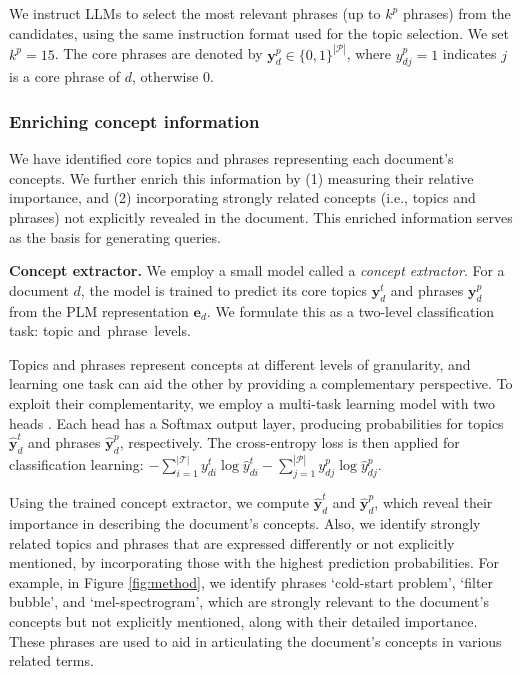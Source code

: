 We instruct LLMs to select the most relevant phrases (up to $k^p$ phrases) from the candidates, using the same instruction format used for the topic selection.
We set $k^p=15$.
The core phrases are denoted by $\mathbf{y}^p_d \in \{0,1\}^{|\mathcal{P}|}$, where $y^p_{dj}=1$ indicates $j$ is a core phrase of $d$, otherwise $0$.


\subsubsection{\textbf{Enriching concept information}}
\label{method:enrich}
We have identified core topics and phrases representing each document's concepts.
We further enrich this information by (1) measuring their relative importance, and (2) incorporating strongly related concepts (i.e., topics and phrases) not explicitly revealed in the document.
This enriched information serves as the basis for generating queries.


\vspace{0.02in} \noindent
\textbf{Concept extractor.}
We employ a small model called a \textit{concept extractor}.
For a document $d$, the model is trained to predict its core topics $\mathbf{y}^{t}_{d}$ and phrases $\mathbf{y}^{p}_{d}$ from the PLM representation $\mathbf{e}_d$.
We formulate this as a two-level classification task: topic and~phrase~levels.



Topics and phrases represent concepts at different levels of granularity, and learning one task can aid the other by providing a complementary perspective.
To exploit their complementarity, we employ a multi-task learning model with two heads \cite{mmoe}.
Each head has a Softmax output layer, producing probabilities for topics $\hat{\mathbf{y}}^{t}_{d}$ and phrases $\hat{\mathbf{y}}^{p}_{d}$, respectively.
The cross-entropy loss is then applied for classification learning: $-\sum_{i=1}^{|\mathcal{T}|} y^t_{di} \log \hat{y}^{t}_{di} - \sum_{j=1}^{|\mathcal{P}|} y^p_{dj} \log \hat{y}^{p}_{dj}$.


Using the trained concept extractor, we compute $\hat{\mathbf{y}}^{t}_{d}$ and $\hat{\mathbf{y}}^{p}_{d}$, which reveal their importance in describing the document's concepts.
Also, we identify strongly related topics and phrases that are expressed differently or not explicitly mentioned, by incorporating those with the highest prediction probabilities.
For example, in Figure \ref{fig:method}, we identify phrases `cold-start problem', `filter bubble', and `mel-spectrogram', which are strongly relevant to the document's concepts but not explicitly mentioned, along with their detailed importance.
These phrases are used to aid in articulating the document's concepts in various related terms.

